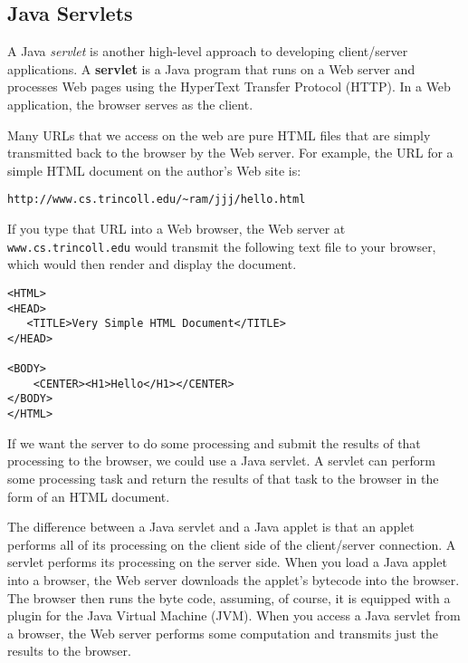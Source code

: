 {{{{\subsection{Java Servlets}

A Java {\em servlet} is another high-level approach to developing
client/server applications.  A {\bf servlet} is a Java program that
runs on a Web server and processes Web pages using the HyperText
Transfer Protocol (HTTP).  In a Web application, the browser serves as
the client.

Many URLs that we access on the web are pure HTML files that are
simply transmitted back to the browser by the Web server.  For
example, the URL for a simple HTML document on the author's Web site
is:

\begin{jjjlisting}
\begin{lstlisting}[commentstyle=\color{black}]
http://www.cs.trincoll.edu/~ram/jjj/hello.html
\end{lstlisting}
\end{jjjlisting}

\noindent If you type that URL into a Web browser, the Web server at
{\tt www.cs.trincoll.edu} would transmit the following text file
to your browser, which would then render and display the document.

\begin{jjjlisting}
\begin{lstlisting}
<HTML>
<HEAD>  
   <TITLE>Very Simple HTML Document</TITLE>
</HEAD>

<BODY>
    <CENTER><H1>Hello</H1></CENTER>
</BODY>
</HTML>
\end{lstlisting}
\end{jjjlisting}

\noindent If we want the server to do some processing and submit the
results of that processing to the browser, we could use a Java
servlet.  A servlet can perform some processing task and return the
results of that task to the browser in the form of an HTML document.

The difference between a Java servlet and a Java applet is that
 an applet performs all of its processing
on the client side of the client/server connection. A servlet performs
its processing on the server side.  When you load a Java applet into a
browser, the Web server downloads the applet's bytecode into the
browser.  The browser then runs the byte code, assuming, of course, it
is equipped with a plugin for the Java Virtual Machine (JVM).  When
you access a Java servlet from a browser, the Web server performs some
computation and transmits just the results to the browser.

}}}}
